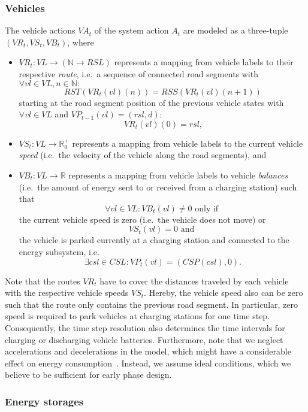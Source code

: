 \subsubsection{Vehicles}
\label{actions_vehicles}

The vehicle actions $VA_t$ of the system action $A_t$ are modeled as a three-tuple $(VR_t, VS_t, VB_t)$, where
\begin{itemize}
	\item $VR_t: VL \rightarrow (\mathbb{N} \rightarrow RSL)$ represents a mapping from vehicle labels to their respective \textit{route}, i.e.\ a sequence of connected road segments with $\forall vl \in VL, n \in \mathbb{N}:$
	\[
		RST(VR_t(vl)(n)) = RSS(VR_t(vl)(n + 1))
	\]
	starting at the road segment position of the previous vehicle states with $\forall vl \in VL$ and $VP_{t-1}(vl) = (rsl, d):$
	\[
		VR_t(vl)(0) = rsl \textrm{,}
	\]
	\item $VS_t: VL \rightarrow \mathbb{R}_0^+$ represents a mapping from vehicle labels to the current vehicle \textit{speed} (i.e.\ the velocity of the vehicle along the road segments), and
	\item $VB_t: VL \rightarrow \mathbb{R}$ represents a mapping from vehicle labels to vehicle \textit{balances} (i.e.\ the amount of energy sent to or received from a charging station) such that
	\[
		\forall vl \in VL: VB_t(vl) \neq 0 \textrm{ only if }
	\]
	the current vehicle speed is zero (i.e.\ the vehicle does not move) or
	\[
		 VS_t(vl) = 0 \textrm{ and }
	\]
	the vehicle is parked currently at a charging station and connected to the energy subsystem, i.e.\
	\[
		\exists csl \in CSL: VP_t(vl) = (CSP(csl), 0) \textrm{.}
	\]
\end{itemize}
Note that the routes $VR_t$ have to cover the distances traveled by each vehicle with the respective vehicle speeds $VS_t$. Hereby, the vehicle speed also can be zero such that the route only contains the previous road segment. In particular, zero speed is required to park vehicles at charging stations for one time step. Consequently, the time step resolution also determines the time intervals for charging or discharging vehicle batteries. Furthermore, note that we neglect accelerations and decelerations in the model, which might have a considerable effect on energy consumption~\cite{?}. Instead, we assume ideal conditions, which we believe to be sufficient for early phase design.

\subsubsection{Energy storages}
\label{actions_storages}

